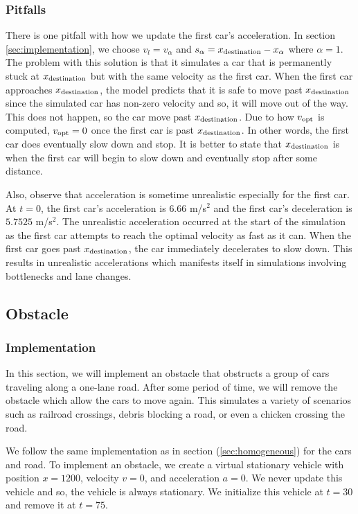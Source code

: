 \documentclass[12pt]{article}
\begin{document}
    \subsubsection{Pitfalls}\label{sec:homogeneous_pitfal}
    There is one pitfall with how we update the first car's acceleration. In section \ref{sec:implementation}, we choose $v_l = v_\alpha$ and $s_\alpha = x_{\rm destination} - x_\alpha$ where $\alpha = 1$. The problem with this solution is that it simulates a car that is permanently stuck at $x_{\rm destination}$ but with the same velocity as the first car. When the first car approaches $x_{\rm destination}$, the model predicts that it is safe to move past $x_{\rm destination}$ since the simulated car has non-zero velocity and so, it will move out of the way. This does not happen, so the car move past $x_{\rm destination}$. Due to how $v_{\rm opt}$ is computed, $v_{\rm opt}=0$ once the first car is past $x_{\rm destination}$. In other words, the first car does eventually slow down and stop. It is better to state that $x_{\rm destination}$ is when the first car will begin to slow down and eventually stop after some distance.  
      
    Also, observe that acceleration is sometime unrealistic especially for the first car. At $t=0$, the first car's acceleration is $6.66$ m/s$^2$ and the first car's deceleration is $5.7525$ m/s$^2$. The unrealistic acceleration occurred at the start of the simulation as the first car attempts to reach the optimal velocity as fast as it can. When the first car goes past $x_{\rm destination}$, the car immediately decelerates to slow down. This results in unrealistic accelerations which manifests itself in simulations involving bottlenecks and lane changes. 
    \subsection{Obstacle}
    \subsubsection{Implementation}\label{sec:obsImplementation}
    In this section, we will implement an obstacle that obstructs a group of cars traveling along a one-lane road. After some period of time, we will remove the obstacle which allow the cars to move again.  This simulates a variety of scenarios such as railroad crossings, debris blocking a road, or even a chicken crossing the road. 

    We follow the same implementation as in section (\ref{sec:homogeneous}) for the cars and road. To implement an obstacle, we create a virtual stationary vehicle with position $x=1200$, velocity $v=0$, and acceleration $a=0$. We never update this vehicle and so, the vehicle is always stationary. We initialize this vehicle at $t=30$ and remove it at $t=75$. 
\end{document}
